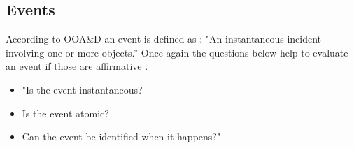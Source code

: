 \subsection{Events}
According to OOA\&D an event is defined as \citep[p.~53]{Rod-Aalborg}:
"An instantaneous incident involving one or more objects.''
Once again the questions below help to evaluate an event if those are affirmative \citep[p.~65]{Rod-Aalborg}.
\begin{itemize}
	\item "Is the event instantaneous?
	\item Is the event atomic?
	\item Can the event be identified when it happens?"
\end{itemize}

